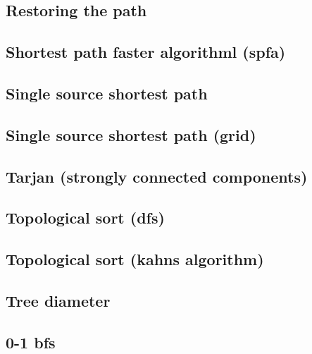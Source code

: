 \subsection{Restoring the path}
\raggedbottom
\hrulefill
\subsection{Shortest path faster algorithml (spfa)}
\raggedbottom
\hrulefill
\subsection{Single source shortest path}
\raggedbottom
\hrulefill
\subsection{Single source shortest path (grid)}
\raggedbottom
\hrulefill
\subsection{Tarjan (strongly connected components)}
\raggedbottom
\hrulefill
\subsection{Topological sort (dfs)}
\raggedbottom
\hrulefill
\subsection{Topological sort (kahns algorithm)}
\raggedbottom
\hrulefill
\subsection{Tree diameter}
\raggedbottom
\hrulefill
\subsection{0-1 bfs}
\raggedbottom
\hrulefill
